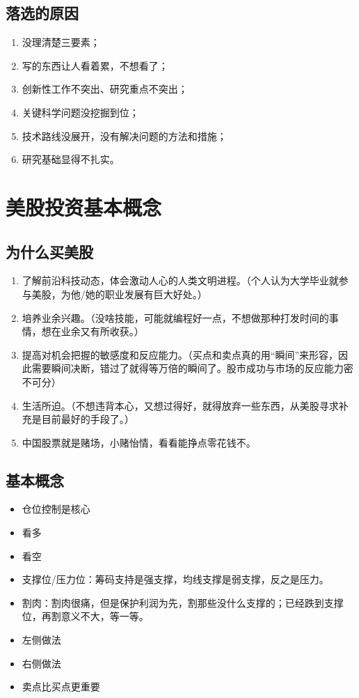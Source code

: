 \subsection{落选的原因}
\begin{enumerate}
\item 没理清楚三要素；
\item 写的东西让人看着累，不想看了；
\item 创新性工作不突出、研究重点不突出；
\item 关键科学问题没挖掘到位；
\item 技术路线没展开，没有解决问题的方法和措施；
\item 研究基础显得不扎实。
\end{enumerate}



\section{美股投资基本概念}
\subsection{为什么买美股}
\begin{enumerate}
\item 了解前沿科技动态，体会激动人心的人类文明进程。（个人认为大学毕业就参与美股，为他/她的职业发展有巨大好处。）

\item 培养业余兴趣。（没啥技能，可能就编程好一点，不想做那种打发时间的事情，想在业余又有所收获。）

\item 提高对机会把握的敏感度和反应能力。（买点和卖点真的用“瞬间”来形容，因此需要瞬间决断，错过了就得等万倍的瞬间了。股市成功与市场的反应能力密不可分）

\item 生活所迫。（不想违背本心，又想过得好，就得放弃一些东西，从美股寻求补充是目前最好的手段了。）

\item 中国股票就是赌场，小赌怡情，看看能挣点零花钱不。
\end{enumerate}



\subsection{基本概念}
\begin{itemize}
\item 仓位控制是核心
\item 看多
\item 看空
\item 支撑位/压力位：筹码支持是强支撑，均线支撑是弱支撑，反之是压力。
\item 割肉：割肉很痛，但是保护利润为先，割那些没什么支撑的；已经跌到支撑位，再割意义不大，等一等。
\item 左侧做法
\item 右侧做法
\item 卖点比买点更重要
\end{itemize}










